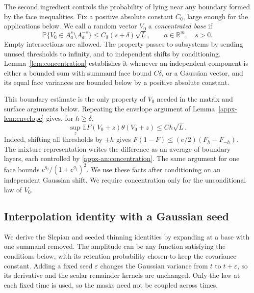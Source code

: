 \documentclass[11pt,letterpaper]{article}
\theoremstyle{remark}
\newcommand{\E}{\mathbb E}
\newcommand{\Pp}{\mathbb P}
\newcommand{\R}{\mathbb R}
\begin{document}
The second ingredient controls the probability of lying near any
boundary formed by the face inequalities. Fix a positive absolute
constant \(C_0\), large enough for the applications below. We call
a random vector \(V_0\) a \emph{concentrated base} if
\begin{equation}
 \Pp\{V_0\in A_a^s\setminus A_a^{-s}\}
 \le C_0(s+\delta)\sqrt L,
 \qquad a\in\R^m,\quad s>0.
 \label{appx-an:concentration}
\end{equation}
Empty intersections are allowed. The property passes to subsystems
by sending unused thresholds to infinity, and to independent shifts
by conditioning. Lemma~\ref{lem:concentration} establishes it whenever an independent component is
either a bounded sum with summand face bound \(C\delta\), or a
Gaussian vector, and its equal face variances are bounded below by
a positive absolute constant.

This boundary estimate is the only property of \(V_0\) needed in the
matrix and surface arguments below. Repeating the envelope argument of
Lemma~\ref{appx-lem:envelope} gives, for \(h\ge\delta\),
\begin{equation}
 \sup_z\E F(V_0+z)\theta(V_0+z)\le Ch\sqrt L.
 \label{appx-an:weight-concentration}
\end{equation}
Indeed, shifting all thresholds by \(\pm h\) gives
\(F(1-F)\le(e/2)(F_h-F_{-h})\). The mixture representation writes
the difference as an average of boundary layers, each controlled by
\eqref{appx-an:concentration}. The same argument for one face bounds
\(e^{q_j}/(1+e^{q_j})^2\). We use these facts after conditioning on
an independent Gaussian shift. We require concentration only for the
unconditional law of \(V_0\).

\subsection{Interpolation identity with a Gaussian seed}
\label{appx-an:sec:path}

We derive the Slepian and seeded thinning identities by expanding at
a base with one summand removed. The amplitude can be any function
satisfying the conditions below, with its retention probability chosen
to keep the covariance constant. Adding a fixed seed \(\varepsilon\)
changes the Gaussian variance from \(t\) to \(t+\varepsilon\),
so its derivative and the scalar remainder kernels are unchanged.
Only the law at each fixed time is used, so the masks need not be
coupled across times.
\end{document}

